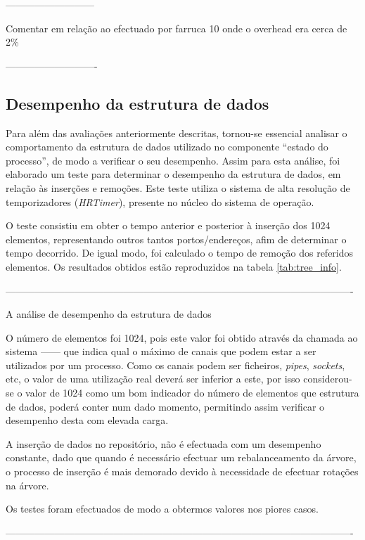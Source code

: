 ---------------------------

Comentar em relação ao efectuado por farruca 10 onde o overhead era cerca de 2\% 

----------------------------

\subsection{Desempenho da estrutura de dados}

Para além das avaliações anteriormente descritas, tornou-se essencial analisar o comportamento da estrutura de dados utilizado no componente “estado do processo”, de modo a verificar o seu desempenho.
Assim para esta análise, foi elaborado um teste para determinar o desempenho da estrutura de dados, em relação às inserções e remoções.
Este teste utiliza o sistema de alta resolução de temporizadores (\textit{HRTimer})\cite{hrtimerKernel}, presente no núcleo do sistema de operação.

O teste consistiu em obter o tempo anterior e posterior à inserção dos 1024 elementos, representando outros tantos portos/endereços, afim de determinar o tempo decorrido.
De igual modo, foi calculado o tempo de remoção dos referidos elementos.
Os resultados obtidos estão reproduzidos na tabela \ref{tab:tree_info}.


----------------------------------------------------------------------------------------------------------

A análise de desempenho da estrutura de dados

O número de elementos foi 1024, pois este valor foi obtido através da chamada ao sistema ------ que indica qual o máximo de canais que podem estar a ser utilizados por um processo.
Como os canais podem ser ficheiros, \textit{pipes}, \textit{sockets}, etc, o valor de uma utilização real deverá ser inferior a este, por isso considerou-se o valor de 1024 como um bom indicador do número de elementos que estrutura de dados, poderá conter num dado momento, permitindo assim verificar o desempenho desta com elevada carga.

A inserção de dados no repositório, não é efectuada com um desempenho constante, dado que quando é necessário efectuar um rebalanceamento da árvore, o processo de inserção é mais demorado devido à necessidade de efectuar rotações na árvore.

Os testes foram efectuados de modo a obtermos valores nos piores casos.

----------------------------------------------------------------------------------------------------------
 
